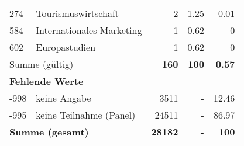 \begin{longtable}{lXrrr}
        274 & \multicolumn{1}{X}{Tourismuswirtschaft} & %
          \num{2} &
          \num[round-mode=places,round-precision=2]{1.25} &
          \num[round-mode=places,round-precision=2]{0.01} \\

        584 & \multicolumn{1}{X}{Internationales Marketing} & %
          \num{1} &
          \num[round-mode=places,round-precision=2]{0.62} &
          \num[round-mode=places,round-precision=2]{0} \\

        602 & \multicolumn{1}{X}{Europastudien} & %
          \num{1} &
          \num[round-mode=places,round-precision=2]{0.62} &
          \num[round-mode=places,round-precision=2]{0} \\

     \midrule
     \multicolumn{2}{l}{Summe (gültig)} &
       \textbf{\num{160}} &
     \textbf{100} &
       \textbf{\num[round-mode=places,round-precision=2]{0.57}} \\
     \multicolumn{5}{l}{\textbf{Fehlende Werte}}\\
       -998 &
       keine Angabe &
         \num{3511} &
        - &
         \num[round-mode=places,round-precision=2]{12.46} \\
       -995 &
       keine Teilnahme (Panel) &
         \num{24511} &
        - &
         \num[round-mode=places,round-precision=2]{86.97} \\
     \midrule
     \multicolumn{2}{l}{\textbf{Summe (gesamt)}} &
          \textbf{\num{28182}} &
        \textbf{-} &
        \textbf{100} \\
     \bottomrule
     \end{longtable}
     
